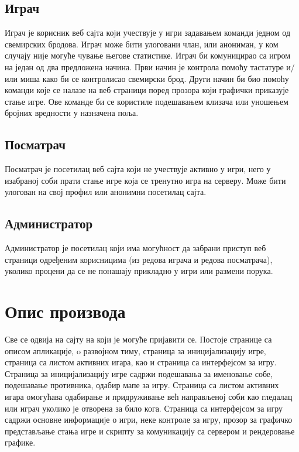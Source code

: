 \subsection{Играч}
Играч је корисник веб сајта који учествује у игри задавањем команди једном од свемирских бродова. Играч може бити
улоговани члан, или анониман, у ком случају није могуће чување његове статистике. Играч би комуницирао са игром на
један од два предложена начина. Први начин је контрола помоћу тастатуре и/или миша како би се контролисао
свемирски брод. Други начин би био помоћу команди које се налазе на веб страници поред прозора који графички
приказује стање игре. Ове команде би се користиле подешавањем клизача или уношењем бројних вредности у назначена
поља.

\subsection{Посматрач}
Посматрач је посетилац веб сајта који не учествује активно у игри, него у изабраној соби прати стање игре 
која се тренутно игра на серверу. Може бити улогован на свој профил или анонимни посетилац сајта.

\subsection{Администратор}
Администратор је посетилац који има могућност да забрани приступ  веб страници одређеним корисницима 
(из редова играча и редова посматрача), уколико процени да се не понашају прикладно у игри или размени порука.



\section{Опис производа}
Све се одвија на сајту на који је могуће пријавити се. Постоје странице са описом апликације, o развојном тиму,
страница за иницијализацију игре, страница са листом активних игара, као и страница са интерфејсом за игру.
Страница за иницијализацију игре садржи подешавања за именовање собе, подешавање противника, одабир мапе за игру.
Страница са листом активних игара омогућава одабирање и придруживање већ направљеној соби као гледалац или играч
уколико је отворена за било кога. Страница са интерфејсом за игру садржи основне информације о игри, неке контроле
за игру, прозор за графичко представљање стања игре и скрипту за комуникацију са сервером и рендеровање графике.

